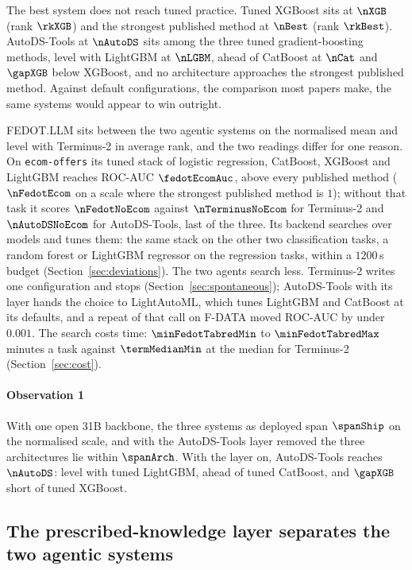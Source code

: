 The best system does not reach tuned practice. Tuned XGBoost sits at $\nXGB$
(rank $\rkXGB$) and the strongest published method at $\nBest$ (rank
$\rkBest$). AutoDS-Tools at $\nAutoDS$ sits among the three tuned
gradient-boosting methods, level with LightGBM at $\nLGBM$, ahead of CatBoost
at $\nCat$ and $\gapXGB$ below XGBoost, and no architecture approaches the
strongest published method. Against default configurations, the comparison
most papers make, the same systems would appear to win outright.

FEDOT.LLM sits between the two agentic systems on the normalised mean and
level with Terminus-2 in average rank, and the two readings differ for one
reason. On \texttt{ecom-offers} its tuned stack of logistic regression,
CatBoost, XGBoost and LightGBM reaches ROC-AUC $\fedotEcomAuc$, above every
published method ($\nFedotEcom$ on a scale where the strongest published
method is $1$); without that task it scores $\nFedotNoEcom$ against
$\nTerminusNoEcom$ for Terminus-2 and $\nAutoDSNoEcom$ for AutoDS-Tools,
last of the three. Its backend searches over models and tunes them: the same
stack on the other two classification tasks, a random forest or LightGBM
regressor on the regression tasks, within a $1200$\,s budget
(Section~\ref{sec:deviations}). The two agents search less. Terminus-2 writes
one configuration and stops (Section~\ref{sec:spontaneous}); AutoDS-Tools
with its layer hands the choice to LightAutoML, which tunes LightGBM and
CatBoost at its defaults, and a repeat of that call on F-DATA moved ROC-AUC
by under $0.001$. The search costs
time: $\minFedotTabredMin$ to $\minFedotTabredMax$ minutes a task against
$\termMedianMin$ at the median for Terminus-2 (Section~\ref{sec:cost}).

\paragraph{Observation 1} With one open 31B backbone, the three systems as
deployed span $\spanShip$ on the normalised scale, and with the AutoDS-Tools
layer removed the three architectures lie within $\spanArch$. With the layer
on, AutoDS-Tools reaches $\nAutoDS$: level with tuned LightGBM, ahead of tuned
CatBoost, and $\gapXGB$ short of tuned XGBoost.

\subsection{The prescribed-knowledge layer separates the two agentic systems}
\label{sec:grid}


